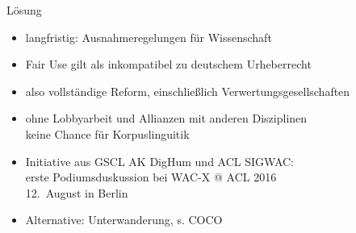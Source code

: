 \begin{frame}
	{Lösung}
	\begin{itemize}
		\item langfristig: Ausnahmeregelungen für Wissenschaft
		\item Fair Use gilt als inkompatibel zu deutschem Urheberrecht
		\item also \alert{vollständige Reform}, einschließlich Verwertungsgesellschaften 
		\item ohne Lobbyarbeit und Allianzen mit anderen Disziplinen\\keine Chance für Korpuslinguitik
		\item Initiative aus GSCL AK DigHum und ACL SIGWAC:\\erste Podiumsduskussion bei WAC-X @ ACL 2016\\12.\ August in Berlin
		\item Alternative: Unterwanderung, s. COCO
	\end{itemize}
\end{frame}


